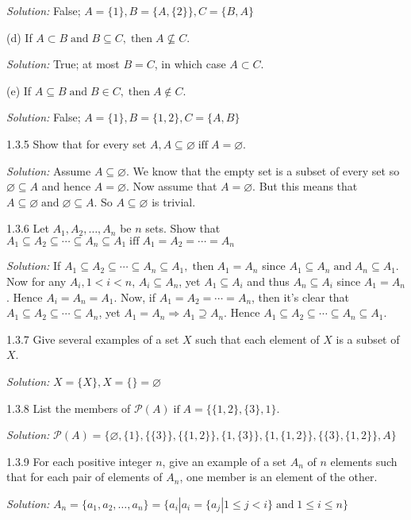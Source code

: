 \documentclass{letter}
\newcommand{\nin}{\not\in}
\newcommand{\tmop}[1]{\ensuremath{\operatorname{#1}}}
\newcommand{\tmtextit}[1]{{\itshape{#1}}}
\begin{document}
\tmtextit{Solution:} False; $A =\{1\}, B =\{A, \{2\}\}, C =\{B, A\}$

(d) If $A \subset B \tmop{and} B \subseteq C, \tmop{then} A \nsubseteq C$.

\tmtextit{Solution:} True; at most $B = C$, in which case $A \subset C$.

(e) If $A \subseteq B \tmop{and} B \in C, \tmop{then} A \nin C$.

\tmtextit{Solution:} False; $A =\{1\}, B =\{1, 2\}, C =\{A, B\}$

1.3.5 Show that for every set $A, A \subseteq \varnothing \tmop{iff} A =
\varnothing$.

\tmtextit{Solution:} Assume $A \subseteq \varnothing$. We know that the empty
set is a subset of every set so $\varnothing \subseteq A$ and hence $A =
\varnothing$. Now assume that $A = \varnothing$. But this means that $A
\subseteq \varnothing \tmop{and} \varnothing \subseteq A$. So $A \subseteq
\varnothing$ is trivial.

1.3.6 Let $A_1, A_2, \ldots, A_n$ be $n$ sets. Show that $A_1 \subseteq A_2
\subseteq \cdots \subseteq A_n \subseteq A_1 \tmop{iff} A_1 = A_2 = \cdots =
A_n$

\tmtextit{Solution:} If $A_1 \subseteq A_2 \subseteq \cdots \subseteq A_n
\subseteq A_1, \tmop{then} A_1 = A_n$ since $A_1 \subseteq A_n \tmop{and} A_n
\subseteq A_1$. Now for any $A_i, 1 < i < n$, $A_i \subseteq A_n$, yet $A_1
\subseteq A_i$ and thus $A_n \subseteq A_i$ since $A_1 = A_n$. Hence $A_i =
A_n = A_1$. Now, if $A_1 = A_2 = \cdots = A_n$, then it's clear that $A_1
\subseteq A_2 \subseteq \cdots \subseteq A_n$, yet $A_1 = A_n \Rightarrow A_1
\supseteq A_n$. Hence $A_1 \subseteq A_2 \subseteq \cdots \subseteq A_n
\subseteq A_1$.

1.3.7 Give several examples of a set $X$ such that each element of $X$ is a
subset of $X$.

\tmtextit{Solution:} $X =\{X\}, X =\{\}= \varnothing$

1.3.8 List the members of $\mathcal{P}(A) \tmop{if} A =\{\{1, 2\}, \{3\},
1\}$.

\tmtextit{Solution:} $\mathcal{P}(A) =\{\varnothing, \{1\}, \{\{3\}\}, \{\{1,
2\}\}, \{1, \{3\}\}, \{1, \{1, 2\}\}, \{\{3\}, \{1, 2\}\}, A\}$

1.3.9 For each positive integer $n$, give an example of a set $A_n$ of $n$
elements such that for each pair of elements of $A_n$, one member is an
element of the other.

\tmtextit{Solution:} $A_n =\{a_1, a_2, \ldots, a_n \}=\{a_i | a_i =\{a_j | 1
\leq j < i\} \tmop{and} 1 \leq i \leq n\}$
\end{document}
